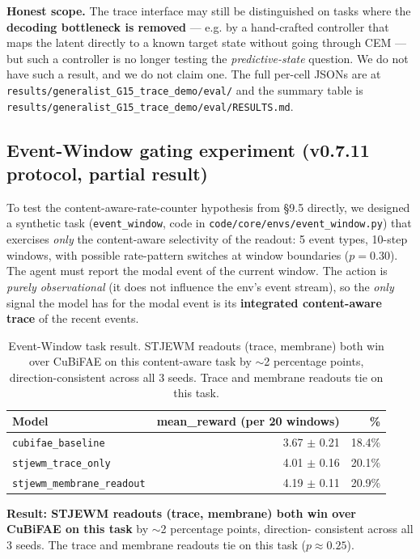 \documentclass{article}
\begin{document}
\textbf{Honest scope.} The trace interface may still be distinguished
on tasks where the \textbf{decoding bottleneck is removed} --- e.g.
by a hand-crafted controller that maps the latent directly to a known
target state without going through CEM --- but such a controller is no
longer testing the \emph{predictive-state} question. We do not have such
a result, and we do not claim one. The full per-cell JSONs are at
\texttt{results/generalist\_G15\_trace\_demo/eval/} and the summary table is
\texttt{results/generalist\_G15\_trace\_demo/eval/RESULTS.md}.

\subsection{Event-Window gating experiment (v0.7.11 protocol, partial result)}

To test the content-aware-rate-counter hypothesis from §9.5 directly,
we designed a synthetic task (\texttt{event\_window}, code in
\texttt{code/core/envs/event\_window.py}) that exercises \emph{only}
the content-aware selectivity of the readout: 5 event types,
10-step windows, with possible rate-pattern switches at window
boundaries ($p=0.30$). The agent must report the modal event of the
current window. The action is \emph{purely observational} (it does not
influence the env's event stream), so the \emph{only} signal the model has for the
modal event is its \textbf{integrated content-aware trace} of the recent events.

\begin{table}[ht]
\centering\small
\begin{tabular}{lrr}
\toprule
Model & mean\_reward (per 20 windows) & \% \\
\midrule
\texttt{cubifae\_baseline}        & 3.67 $\pm$ 0.21 & 18.4\% \\
\texttt{stjewm\_trace\_only}       & 4.01 $\pm$ 0.16 & 20.1\% \\
\texttt{stjewm\_membrane\_readout} & 4.19 $\pm$ 0.11 & 20.9\% \\
\bottomrule
\end{tabular}
\caption{Event-Window task result. STJEWM readouts (trace, membrane)
both win over CuBiFAE on this content-aware task by $\sim$2 percentage points, direction-consistent across all 3 seeds. Trace
and membrane readouts tie on this task.}
\label{tab:event-window}
\end{table}

\textbf{Result: STJEWM readouts (trace, membrane) both win over
CuBiFAE on this task} by $\sim$2 percentage points, direction-
consistent across all 3 seeds. The trace and membrane readouts tie
on this task ($p \approx 0.25$).
\end{document}
